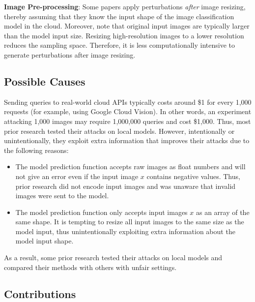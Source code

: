 \textbf{Image Pre-processing}: Some papers apply perturbations \emph{after} image resizing, thereby assuming that they know the input shape of the image classification model in the cloud. Moreover, note that original input images are typically larger than the model input size. Resizing high-resolution images to a lower resolution reduces the sampling space. Therefore, it is less computationally intensive to generate perturbations after image resizing.

\subsection{Possible Causes}

Sending queries to real-world cloud APIs typically costs around \$1 for every 1,000 requests (for example, using Google Cloud Vision). In other words, an experiment attacking 1,000 images may require 1,000,000 queries and cost \$1,000. Thus, most prior research tested their attacks on local models. However, intentionally or unintentionally, they exploit extra information that improves their attacks due to the following reasons:

\begin{itemize}
    \item The model prediction function accepts raw images as float numbers and will not give an error even if the input image $x$ contains negative values. Thus, prior research did not encode input images and was unaware that invalid images were sent to the model.
    \item The model prediction function only accepts input images $x$ as an array of the same shape. It is tempting to resize all input images to the same size as the model input, thus unintentionally exploiting extra information about the model input shape.
\end{itemize}

As a result, some prior research tested their attacks on local models and compared their methods with others with unfair settings. 


\clearpage

\subsection{Contributions}

